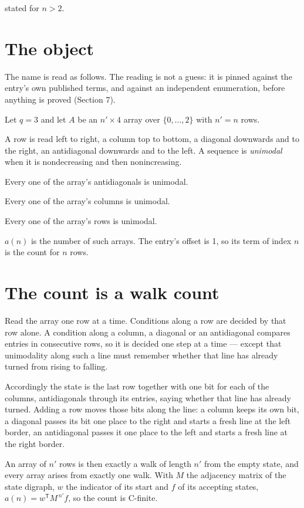 \documentclass[11pt]{article}
\theoremstyle{definition}
\begin{document}
stated for $n > 2$.

\section{The object}

The name is read as follows. The reading is not a guess: it is pinned against the entry's own published terms, and against an independent enumeration, before anything is proved (Section 7).

Let $q = 3$ and let $A$ be an $n' \times 4$ array over $\{0,\dots,2\}$ with $n' = n$ rows.

A row is read left to right, a column top to bottom, a diagonal downwards and to the right, an antidiagonal downwards and to the left. A sequence is {\itshape unimodal} when it is nondecreasing and then nonincreasing.

Every one of the array's antidiagonals is unimodal.

Every one of the array's columns is unimodal.

Every one of the array's rows is unimodal.

$a(n)$ is the number of such arrays. The entry's offset is 1, so its term of index $n$ is the count for $n$ rows.

\section{The count is a walk count}

Read the array one row at a time. Conditions along a row are decided by that row alone. A condition along a column, a diagonal or an antidiagonal compares entries in consecutive rows, so it is decided one step at a time --- except that unimodality along such a line must remember whether that line has already turned from rising to falling.

Accordingly the state is the last row together with one bit for each of the columns, antidiagonals through its entries, saying whether that line has already turned. Adding a row moves those bits along the line: a column keeps its own bit, a diagonal passes its bit one place to the right and starts a fresh line at the left border, an antidiagonal passes it one place to the left and starts a fresh line at the right border.

An array of $n'$ rows is then exactly a walk of length $n'$ from the empty state, and every array arises from exactly one walk. With $M$ the adjacency matrix of the state digraph, $w$ the indicator of its start and $f$ of its accepting states, $a(n) = w^{\mathsf T}M^{\,n'}f$, so the count is C-finite.
\end{document}

